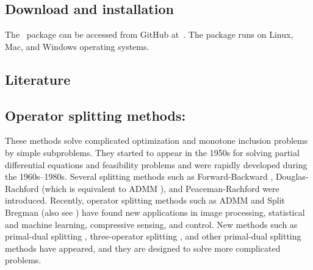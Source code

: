 
\subsection{Download and installation}
The \pkg~package can be accessed from GitHub at~\repo. The package runs on Linux, Mac, and Windows operating systems.
\subsection{Literature}\label{sec:review}
\subsection*{Operator splitting methods:}  These methods solve complicated optimization and monotone inclusion problems by simple subproblems. They started to appear in the 1950s for solving partial differential equations and feasibility problems and were rapidly developed during the 1960s--1980s. Several splitting methods such as Forward-Backward \citep{Passty1979_ergodic}, Douglas-Rachford \citep{DR56} (which is equivalent to ADMM \citep{GabayMercier1976_dual,GlowinskiMarroco1975_approximation}), and Peaceman-Rachford \citep{PR} were introduced. Recently,
operator splitting methods such as ADMM and Split Bregman \citep{GoldsteinOsher2009_split} (also see \citep{WangYangYinZhang2008_NewAlternating}) have found new applications in image processing,
statistical and machine learning, compressive sensing, and control. New methods such as primal-dual splitting \citep{Condat2013_primaldual,Vu2013_splitting}, three-operator splitting \citep{DavisYin2015_threeoperator}, and other primal-dual splitting methods \citep{ChenHuangZhang2016_primaldual,ChenHuangZhang2016_primalduala,LiShenXuZhang2015_multistep} have appeared, and they are designed to solve more complicated problems.


